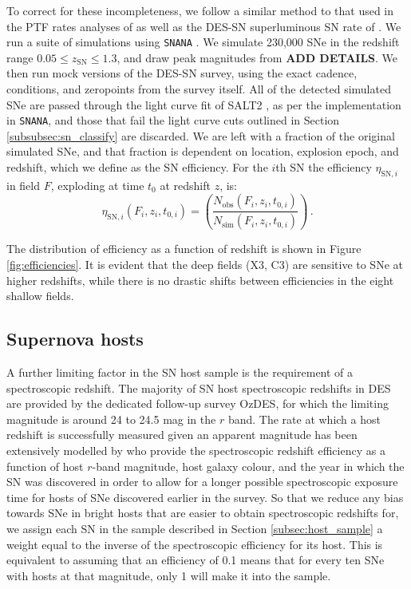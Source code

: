 \documentclass[fleqn,usenatbib]{mnras}
\begin{document}
To correct for these incompleteness, we follow a similar method to that used in the PTF rates analyses of \citet{Frohmaier2019,Frohmaier2020} as well as the DES-SN superluminous SN rate of \citet{Thomas2020}. We run a suite of simulations using \texttt{SNANA} \citet{Kessler2009a}. We simulate 230,000 SNe in the redshift range $0.05 \leq z_{\mathrm{SN}} \leq 1.3$, and draw peak magnitudes from \textbf{ADD DETAILS}. We then run mock versions of the DES-SN survey, using the exact cadence, conditions, and zeropoints from the survey itself. All of the detected simulated SNe are passed through the light curve fit of SALT2 \citep{Betoule2014}, as per the implementation in \texttt{SNANA}, and those that fail the light curve cuts outlined in Section \ref{subsubsec:sn_classify} are discarded. We are left with a fraction of the original simulated SNe, and that fraction is dependent on location, explosion epoch, and redshift, which we define as the SN efficiency. For the $i$th SN the efficiency $\eta_{\mathrm{SN}, i}$ in field $F$, exploding at time $t_0$ at redshift $z$, is:
\begin{equation}
    \eta_{\mathrm{SN},i} (F_i,z_i,t_{0,i}) = \left( \frac{N_{\mathrm{obs}}\left(F_i,z_i,t_{0,i}\right)}{N_{\mathrm{sim}}\left(F_i,z_i,t_{0,i}\right)}\right)\,.
\end{equation}

The distribution of efficiency as a function of redshift is shown in Figure \ref{fig:efficiencies}. It is evident that the deep fields (X3, C3) are sensitive to SNe at higher redshifts, while there is no drastic shifts between efficiencies in the eight shallow fields. 


\subsection{Supernova hosts \label{subsec:incompletenss_SN_hosts}}
A further limiting factor in the SN host sample is the requirement of a spectroscopic redshift. The majority of SN host spectroscopic redshifts in DES are provided by the dedicated follow-up survey OzDES, for which the limiting magnitude is around 24 to 24.5 mag in the $r$ band. The rate at which a host redshift is successfully measured given an apparent magnitude has been extensively modelled by  who provide the spectroscopic redshift efficiency as a function of host $r$-band magnitude, host galaxy colour, and the year in which the SN was discovered in order to allow for a longer possible spectroscopic exposure time for hosts of SNe discovered earlier in the survey. So that we reduce any bias towards SNe in bright hosts that are easier to obtain spectroscopic redshifts for, we assign each SN in the sample described in Section \ref{subsec:host_sample} a weight equal to the inverse of the spectroscopic efficiency for its host. This is equivalent to assuming that an efficiency of 0.1 means that for every ten SNe with hosts at that magnitude, only 1 will make it into the sample.
\end{document}
